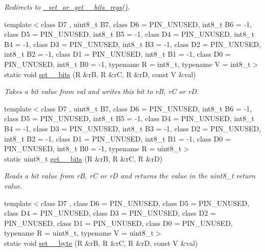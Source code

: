 \begin{DoxyCompactItemize}
\begin{DoxyCompactList}\small\item\em Redirects to \hyperlink{namespaceports_a541ed8a2807f6d65c80cdf90cd7106eb}{\+\_\+set\+\_\+or\+\_\+get\+\_\+\_\+bits\+\_\+regs()}. \end{DoxyCompactList}\item 
{\footnotesize template$<$class D7 , uint8\+\_\+t B7, class D6  = P\+I\+N\+\_\+\+U\+N\+U\+S\+ED, int8\+\_\+t B6 = -\/1, class D5  = P\+I\+N\+\_\+\+U\+N\+U\+S\+ED, int8\+\_\+t B5 = -\/1, class D4  = P\+I\+N\+\_\+\+U\+N\+U\+S\+ED, int8\+\_\+t B4 = -\/1, class D3  = P\+I\+N\+\_\+\+U\+N\+U\+S\+ED, int8\+\_\+t B3 = -\/1, class D2  = P\+I\+N\+\_\+\+U\+N\+U\+S\+ED, int8\+\_\+t B2 = -\/1, class D1  = P\+I\+N\+\_\+\+U\+N\+U\+S\+ED, int8\+\_\+t B1 = -\/1, class D0  = P\+I\+N\+\_\+\+U\+N\+U\+S\+ED, int8\+\_\+t B0 = -\/1, typename R  = int8\+\_\+t, typename V  = int8\+\_\+t$>$ }\\static void \hyperlink{namespaceports_aac15fb87d8fede3f2bf8d764ab42965f}{set\+\_\+\_\+bits} (R \&rB, R \&rC, R \&rD, const V \&val)
\begin{DoxyCompactList}\small\item\em Takes a bit value from {\ttfamily val} and writes this bit to {\ttfamily rB}, {\ttfamily rC} or {\ttfamily rD}. \end{DoxyCompactList}\item 
{\footnotesize template$<$class D7 , uint8\+\_\+t B7, class D6  = P\+I\+N\+\_\+\+U\+N\+U\+S\+ED, int8\+\_\+t B6 = -\/1, class D5  = P\+I\+N\+\_\+\+U\+N\+U\+S\+ED, int8\+\_\+t B5 = -\/1, class D4  = P\+I\+N\+\_\+\+U\+N\+U\+S\+ED, int8\+\_\+t B4 = -\/1, class D3  = P\+I\+N\+\_\+\+U\+N\+U\+S\+ED, int8\+\_\+t B3 = -\/1, class D2  = P\+I\+N\+\_\+\+U\+N\+U\+S\+ED, int8\+\_\+t B2 = -\/1, class D1  = P\+I\+N\+\_\+\+U\+N\+U\+S\+ED, int8\+\_\+t B1 = -\/1, class D0  = P\+I\+N\+\_\+\+U\+N\+U\+S\+ED, int8\+\_\+t B0 = -\/1, typename R  = uint8\+\_\+t$>$ }\\static uint8\+\_\+t \hyperlink{namespaceports_a9a1959ec95780c00a964b174a27b2a37}{get\+\_\+\_\+bits} (R \&rB, R \&rC, R \&rD)
\begin{DoxyCompactList}\small\item\em Reads a bit value from {\ttfamily rB}, {\ttfamily rC} or {\ttfamily rD} and returns the value in the {\ttfamily uint8\+\_\+t} return value. \end{DoxyCompactList}\item 
{\footnotesize template$<$class D7 , class D6  = P\+I\+N\+\_\+\+U\+N\+U\+S\+ED, class D5  = P\+I\+N\+\_\+\+U\+N\+U\+S\+ED, class D4  = P\+I\+N\+\_\+\+U\+N\+U\+S\+ED, class D3  = P\+I\+N\+\_\+\+U\+N\+U\+S\+ED, class D2  = P\+I\+N\+\_\+\+U\+N\+U\+S\+ED, class D1  = P\+I\+N\+\_\+\+U\+N\+U\+S\+ED, class D0  = P\+I\+N\+\_\+\+U\+N\+U\+S\+ED, typename R  = uint8\+\_\+t, typename V  = uint8\+\_\+t$>$ }\\static void \hyperlink{namespaceports_a7034c689dd509dc9c11ba8be46a26fd0}{set\+\_\+\_\+byte} (R \&rB, R \&rC, R \&rD, const V \&val)

\end{DoxyCompactItemize}
